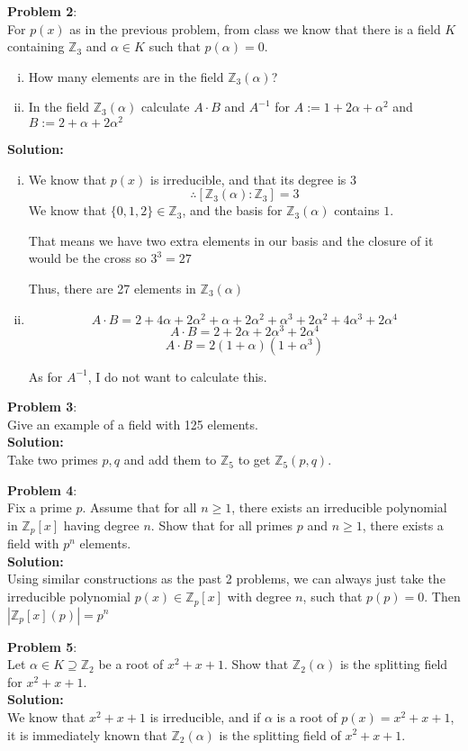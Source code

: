 \documentclass[11pt]{article}
\newcommand{\prob}[3]{\begin{flushleft}
        \textbf{Problem #1}: \\
        #2 
		\textbf{Solution:} 
		#3

\end{flushleft}}
\begin{document}
\prob{2}{
  For $p(x)$ as in the previous problem, from class we know that there is a field $K$ containing $\mathbb{Z}_3$ and $\alpha \in K$ such that $p(\alpha) = 0$.
  \begin{enumerate}[(i)]
    \item How many elements are in the field $\mathbb{Z}_3(\alpha)$?
    \item In the field $\mathbb{Z}_3(\alpha)$ calculate $A \cdot B$ and $A^{-1}$ for
          $A := 1 + 2 \alpha + \alpha^2$ and $B := 2 + \alpha + 2 \alpha^2$
  \end{enumerate}
}{
  \begin{enumerate}[(i)]
    \item We know that $p(x)$ is irreducible, and that its degree is $3$
          $$\therefore [\mathbb{Z}_3(\alpha) : \mathbb{Z}_3] = 3$$
          We know that $\{ 0,1,2 \} \in \mathbb{Z}_3$, and the basis for
          $\mathbb{Z}_3(\alpha)$ contains $1$.

          That means we have two extra elements in our basis and the closure of it would be the cross so $3^3 = 27$

          Thus, there are 27 elements in $\mathbb{Z}_3(\alpha)$

    \item $$A \cdot B = 2 + 4\alpha + 2\alpha^2 + \alpha + 2\alpha^2 + \alpha^3 + 2 \alpha^2 + 4\alpha^3 + 2 \alpha^4$$
          $$A \cdot B = 2 + 2\alpha + 2\alpha^3 + 2\alpha^4$$
          $$A \cdot B = 2(1 + \alpha)(1 + \alpha^3)$$

          As for $A^{-1}$, I do not want to calculate this.
  \end{enumerate}
}

\prob{3}{
  Give an example of a field with 125 elements. \\
}{ \\
  Take two primes $p,q$ and add them to $\mathbb{Z}_5$
  to get $\mathbb{Z}_5(p,q)$.
}

\prob{4}{
Fix a prime $p$. Assume that for all $n \geq 1$, there exists an irreducible polynomial in $\mathbb{Z}_p[x]$ having degree $n$. Show that for all primes $p$ and $n \geq 1$, there exists a field with $p^n$ elements. \\
}{ \\
Using similar constructions as the past 2 problems,
we can always just take the irreducible polynomial $p(x) \in \mathbb{Z}_p[x]$ with degree $n$, such that $p(p) = 0$.
Then $|\mathbb{Z}_p[x](p)| = p^n$
}

\prob{5}{
  Let $\alpha \in K \supseteq \mathbb{Z}_2$ be a root of $x^2 + x + 1$.
  Show that $\mathbb{Z}_2(\alpha)$ is the splitting field for $x^2 + x + 1$. \\
}{\\
  We know that $x^2 + x + 1$ is irreducible, and if $\alpha$ is a root of $p(x) = x^2 + x + 1$, it is immediately known that $\mathbb{Z}_2(\alpha)$ is the splitting field of $x^2 + x + 1$.
}
\end{document}
